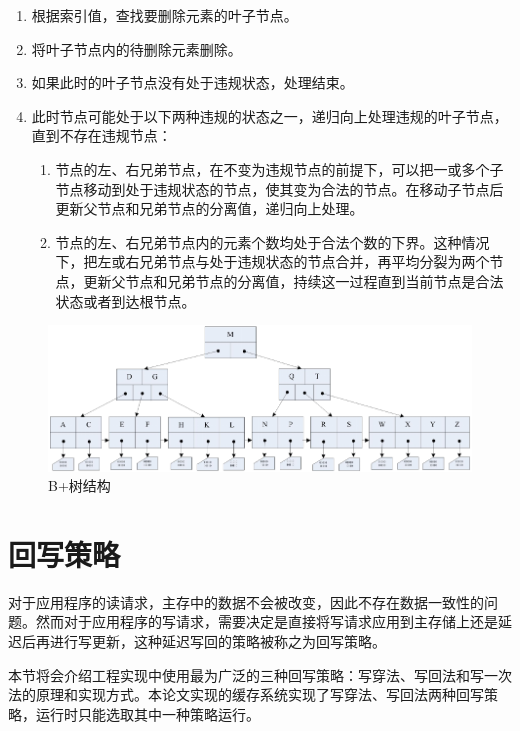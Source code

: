 \begin{itemize}
\begin{enumerate}
\item 根据索引值，查找要删除元素的叶子节点。
\item 将叶子节点内的待删除元素删除。
\item 如果此时的叶子节点没有处于违规状态，处理结束。
\item 此时节点可能处于以下两种违规的状态之一，递归向上处理违规的叶子节点，直到不存在违规节点：
\begin{enumerate}
\item 节点的左、右兄弟节点，在不变为违规节点的前提下，可以把一或多个子节点移动到处于违规状态的节点，使其变为合法的节点。在移动子节点后更新父节点和兄弟节点的分离值，递归向上处理。
\item 节点的左、右兄弟节点内的元素个数均处于合法个数的下界。这种情况下，把左或右兄弟节点与处于违规状态的节点合并，再平均分裂为两个节点，更新父节点和兄弟节点的分离值，持续这一过程直到当前节点是合法状态或者到达根节点。
\end{enumerate}
\end{enumerate}

\end{itemize}

\begin{figure}[H]
\centering
\includegraphics[width=1\linewidth]{./graph/bplus-tree}
\caption{B+树结构}
\label{fig:bplus-tree}
\end{figure}

\section{回写策略}
\label{sec:wb_strategy}

对于应用程序的读请求，主存中的数据不会被改变，因此不存在数据一致性的问题。然而对于应用程序的写请求，需要决定是直接将写请求应用到主存储上还是延迟后再进行写更新，这种延迟写回的策略被称之为回写策略\cite{writeback2014}。

本节将会介绍工程实现中使用最为广泛的三种回写策略：写穿法、写回法和写一次法的原理和实现方式。本论文实现的缓存系统实现了写穿法、写回法两种回写策略，运行时只能选取其中一种策略运行。

